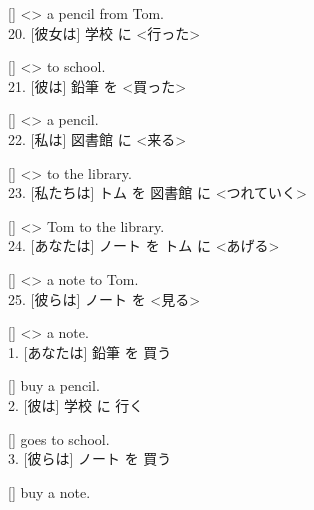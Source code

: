 \documentclass[uplatex,
paper=a4,
fontsize=18pt,
jafontsize=16pt,
number_of_lines=30,
line_length=30zh,
baselineskip=25pt,
]{jlreq}
\begin{document}
  [\hspace{3em}] <\hspace{3em}> a pencil from Tom.
\\

20.  [彼女は] 学校 に <行った>

  [\hspace{3em}] <\hspace{3em}> to school.
\\

21.  [彼は] 鉛筆 を <買った>

  [\hspace{3em}] <\hspace{3em}> a pencil.
\\

22.  [私は] 図書館 に <来る>

  [\hspace{3em}] <\hspace{3em}> to the library.
\\

23.  [私たちは] トム を 図書館 に <つれていく>

  [\hspace{3em}] <\hspace{3em}> Tom to the library.
\\

24.  [あなたは] ノート を トム に <あげる>

  [\hspace{3em}] <\hspace{3em}> a note to Tom.
\\

25.  [彼らは] ノート を <見る>

  [\hspace{3em}] <\hspace{3em}> a note.
\\


\newpage
{}
1.  [あなたは] 鉛筆 を 買う

  [\hspace{3em}] buy a pencil.
\\

2.  [彼は] 学校 に 行く

  [\hspace{3em}] goes to school.
\\

3.  [彼らは] ノート を 買う

  [\hspace{3em}] buy a note.
\\
\end{document}
